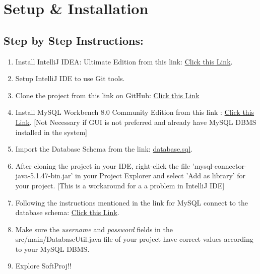 %
\chapter{Setup \& Installation}
\label{sec:chapter-setup}

\section{Step by Step Instructions:}

\begin{enumerate}
\itemsep-1.1em 
    \item Install IntelliJ IDEA: Ultimate Edition from this link: \textcolor{ctcolormain}{ \href{https://www.jetbrains.com/idea/download/download-thanks.html?platform=windows}{ Click this Link}}.
    \item Setup IntelliJ IDE to use Git tools.
    \item Clone the project from this link on GitHub:\textcolor{ctcolormain}{ \href{https://github.com/TimArt/SoftProj/tree/DatabaseIntegration}{ Click this Link}}
    \item Install MySQL Workbench 8.0 Community Edition from this link : \textcolor{ctcolormain}{ \href{https://dev.mysql.com/downloads/}{ Click this Link}}. [Not Necessary if GUI is not preferred and already have MySQL DBMS installed in the system] 
    \item Import the Database Schema from the link: \textcolor{ctcolormain}{ \href{https://github.com/TimArt/SoftProj/tree/DatabaseIntegration/db-src}{ database.sql}}.
    \item After cloning the project in your IDE, right-click the file 'mysql-connector-java-5.1.47-bin.jar' in your Project Explorer and select 'Add as library' for your project. [This is a workaround for a a problem in IntelliJ IDE]
    \item Following the instructions mentioned in the link for MySQL connect to the database schema: \textcolor{ctcolormain}{ \href{https://www.jetbrains.com/help/idea/connecting-to-a-database.html}{ Click this Link}}.
    \item Make sure the \textit{username} and \textit{password} fields in the src/main/DatabaseUtil.java file of your project have correct values according to your MySQL DBMS.
    \item Explore \textcolor{ctcolormain}{ SoftProj!!}
\end{enumerate}


